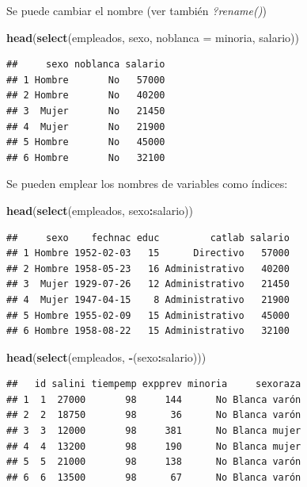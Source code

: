 \documentclass[]{book}
\newenvironment{Shaded}{\begin{snugshade}}{\end{snugshade}}
\newcommand{\DataTypeTok}[1]{\textcolor[rgb]{0.13,0.29,0.53}{#1}}
\newcommand{\KeywordTok}[1]{\textcolor[rgb]{0.13,0.29,0.53}{\textbf{#1}}}
\newcommand{\NormalTok}[1]{#1}
\newcommand{\OperatorTok}[1]{\textcolor[rgb]{0.81,0.36,0.00}{\textbf{#1}}}
\begin{document}
Se puede cambiar el nombre (ver también \emph{?rename()})

\begin{Shaded}
\begin{Highlighting}[]
\KeywordTok{head}\NormalTok{(}\KeywordTok{select}\NormalTok{(empleados, sexo, }\DataTypeTok{noblanca =}\NormalTok{ minoria, salario))}
\end{Highlighting}
\end{Shaded}

\begin{verbatim}
##     sexo noblanca salario
## 1 Hombre       No   57000
## 2 Hombre       No   40200
## 3  Mujer       No   21450
## 4  Mujer       No   21900
## 5 Hombre       No   45000
## 6 Hombre       No   32100
\end{verbatim}

Se pueden emplear los nombres de variables como índices:

\begin{Shaded}
\begin{Highlighting}[]
\KeywordTok{head}\NormalTok{(}\KeywordTok{select}\NormalTok{(empleados, sexo}\OperatorTok{:}\NormalTok{salario))}
\end{Highlighting}
\end{Shaded}

\begin{verbatim}
##     sexo    fechnac educ         catlab salario
## 1 Hombre 1952-02-03   15      Directivo   57000
## 2 Hombre 1958-05-23   16 Administrativo   40200
## 3  Mujer 1929-07-26   12 Administrativo   21450
## 4  Mujer 1947-04-15    8 Administrativo   21900
## 5 Hombre 1955-02-09   15 Administrativo   45000
## 6 Hombre 1958-08-22   15 Administrativo   32100
\end{verbatim}

\begin{Shaded}
\begin{Highlighting}[]
\KeywordTok{head}\NormalTok{(}\KeywordTok{select}\NormalTok{(empleados, }\OperatorTok{-}\NormalTok{(sexo}\OperatorTok{:}\NormalTok{salario)))}
\end{Highlighting}
\end{Shaded}

\begin{verbatim}
##   id salini tiempemp expprev minoria     sexoraza
## 1  1  27000       98     144      No Blanca varón
## 2  2  18750       98      36      No Blanca varón
## 3  3  12000       98     381      No Blanca mujer
## 4  4  13200       98     190      No Blanca mujer
## 5  5  21000       98     138      No Blanca varón
## 6  6  13500       98      67      No Blanca varón
\end{verbatim}
\end{document}
